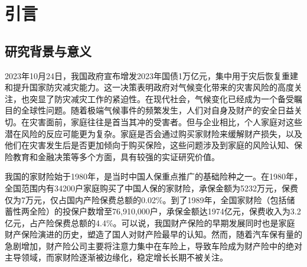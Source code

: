 \chapter{引言}
\section{研究背景与意义}

2023年10月24日，我国政府宣布增发2023年国债1万亿元，集中用于灾后恢复重建和提升国家防灾减灾能力。这一决策表明政府对气候变化带来的灾害风险的高度关注，也突显了防灾减灾工作的紧迫性。在现代社会，气候变化已经成为一个备受瞩目的全球性问题。随着极端气候事件的频繁发生，人们对自身及财产的安全日益关切。在灾害面前，家庭往往是首当其冲的受害者。但与企业相比，个人家庭对这些潜在风险的反应可能更为复杂。家庭是否会通过购买家财险来缓解财产损失，以及他们在灾害发生后是否更加倾向于购买保险，这些问题涉及到家庭的风险认知、保险教育和金融决策等多个方面，具有较强的实证研究价值。

我国的家财险始于1980年，是当时中国人保重点推广的基础险种之一。在1980年，全国范围内有34200户家庭购买了中国人保的家财险，承保金额为5232万元，保费仅为7万元，仅占国内产险保费总额的0.02\%。到了1989年，全国家财险（包括储蓄性两全险）的投保户数增至76,910,000户，承保金额达1974亿元，保费收入为3.2亿元，占产险保费总额的4.4\%。可以说，我国财产保险的早期发展同时也是家庭财产保险演进的历史\citep{黄英君2008论我国产险公司分散性业务营销模式的创新}，塑造了国人对财产险最早的认知。然而，随着汽车保有量的急剧增加，财产险公司主要将注意力集中在车险上，导致车险成为财产险中的绝对主导领域，而家财险逐渐被边缘化，稳定增长长期不被关注。


